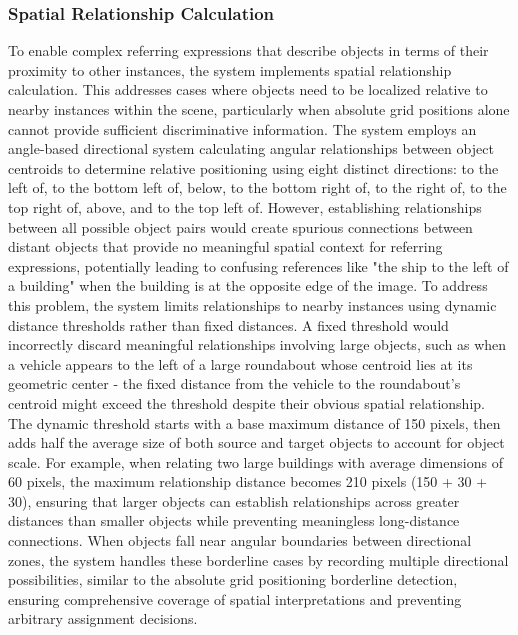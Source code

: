 \subsubsection{Spatial Relationship Calculation}
To enable complex referring expressions that describe objects in terms of their proximity to other instances, the system implements spatial relationship calculation. This addresses cases where objects need to be localized relative to nearby instances within the scene, particularly when absolute grid positions alone cannot provide sufficient discriminative information. The system employs an angle-based directional system calculating angular relationships between object centroids to determine relative positioning using eight distinct directions: to the left of, to the bottom left of, below, to the bottom right of, to the right of, to the top right of, above, and to the top left of. However, establishing relationships between all possible object pairs would create spurious connections between distant objects that provide no meaningful spatial context for referring expressions, potentially leading to confusing references like "the ship to the left of a building" when the building is at the opposite edge of the image. To address this problem, the system limits relationships to nearby instances using dynamic distance thresholds rather than fixed distances. A fixed threshold would incorrectly discard meaningful relationships involving large objects, such as when a vehicle appears to the left of a large roundabout whose centroid lies at its geometric center - the fixed distance from the vehicle to the roundabout's centroid might exceed the threshold despite their obvious spatial relationship. The dynamic threshold starts with a base maximum distance of 150 pixels, then adds half the average size of both source and target objects to account for object scale. For example, when relating two large buildings with average dimensions of 60 pixels, the maximum relationship distance becomes 210 pixels (150 + 30 + 30), ensuring that larger objects can establish relationships across greater distances than smaller objects while preventing meaningless long-distance connections. When objects fall near angular boundaries between directional zones, the system handles these borderline cases by recording multiple directional possibilities, similar to the absolute grid positioning borderline detection, ensuring comprehensive coverage of spatial interpretations and preventing arbitrary assignment decisions.

